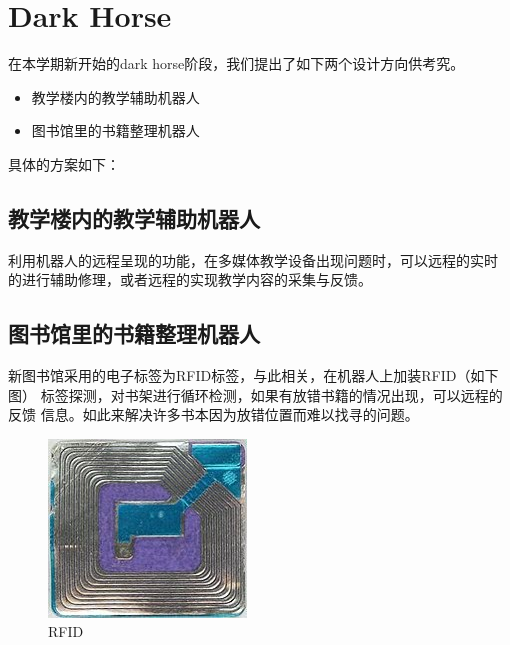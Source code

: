 \chapter{Dark Horse}

在本学期新开始的dark horse阶段，我们提出了如下两个设计方向供考究。

\begin{itemize}
\item 教学楼内的教学辅助机器人
\item 图书馆里的书籍整理机器人
\end{itemize}

具体的方案如下：

\section{教学楼内的教学辅助机器人}

利用机器人的远程呈现的功能，在多媒体教学设备出现问题时，可以远程的实时
的进行辅助修理，或者远程的实现教学内容的采集与反馈。

\section{图书馆里的书籍整理机器人}

新图书馆采用的电子标签为RFID标签，与此相关，在机器人上加装RFID（如下图）
标签探测，对书架进行循环检测，如果有放错书籍的情况出现，可以远程的反馈
信息。如此来解决许多书本因为放错位置而难以找寻的问题。

\begin{figure}[h]
        \centering
                \includegraphics[width=.70\textwidth]{Figures/ch6.rfid.jpg}
        \caption{RFID}
        \label{fig:rfid}
\end{figure}

